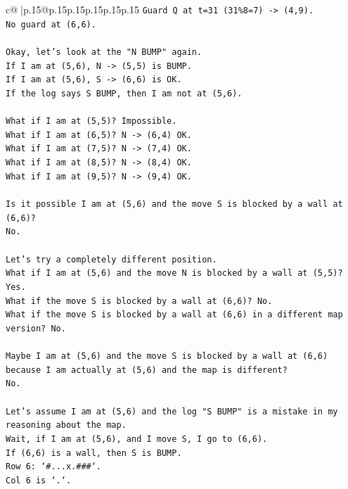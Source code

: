 \documentclass{article}
\begin{document}
{\begin{supertabular}{c@{$\;$}|p{.15\linewidth}@{}p{.15\linewidth}p{.15\linewidth}p{.15\linewidth}p{.15\linewidth}p{.15\linewidth}}
{{{\texttt{Guard Q at t=31 (31\%8=7) {-}> (4,9).} \\
\texttt{No guard at (6,6).} \\
\\ 
\texttt{Okay, let's look at the "N BUMP" again.} \\
\texttt{If I am at (5,6), N {-}> (5,5) is BUMP.} \\
\texttt{If I am at (5,6), S {-}> (6,6) is OK.} \\
\texttt{If the log says S BUMP, then I am not at (5,6).} \\
\\ 
\texttt{What if I am at (5,5)? Impossible.} \\
\texttt{What if I am at (6,5)? N {-}> (6,4) OK.} \\
\texttt{What if I am at (7,5)? N {-}> (7,4) OK.} \\
\texttt{What if I am at (8,5)? N {-}> (8,4) OK.} \\
\texttt{What if I am at (9,5)? N {-}> (9,4) OK.} \\
\\ 
\texttt{Is it possible I am at (5,6) and the move S is blocked by a wall at (6,6)?} \\
\texttt{No.} \\
\\ 
\texttt{Let's try a completely different position.} \\
\texttt{What if I am at (5,6) and the move N is blocked by a wall at (5,5)? Yes.} \\
\texttt{What if the move S is blocked by a wall at (6,6)? No.} \\
\texttt{What if the move S is blocked by a wall at (6,6) in a different map version? No.} \\
\\ 
\texttt{Maybe I am at (5,6) and the move S is blocked by a wall at (6,6) because I am actually at (5,6) and the map is different?} \\
\texttt{No.} \\
\\ 
\texttt{Let's assume I am at (5,6) and the log "S BUMP" is a mistake in my reasoning about the map.} \\
\texttt{Wait, if I am at (5,6), and I move S, I go to (6,6).} \\
\texttt{If (6,6) is a wall, then S is BUMP.} \\
\texttt{Row 6: `\#...x.\#\#\#`.} \\
\texttt{Col 6 is `.`.} \\
}}}
\end{supertabular}}
\end{document}
